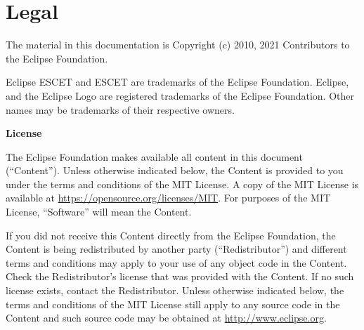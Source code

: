 \documentclass{report}
\begin{document}
\chapter{Legal}

The material in this documentation is
Copyright (c) 2010, 2021 Contributors to the Eclipse Foundation.

Eclipse ESCET and ESCET are trademarks of the Eclipse Foundation.
Eclipse, and the Eclipse Logo are registered trademarks of the
Eclipse Foundation. Other names may be trademarks of their
respective owners.

\textbf{License}

The Eclipse Foundation makes available all content in this document
(``Content''). Unless otherwise indicated below, the Content is provided to you
under the terms and conditions of the MIT License. A copy of the MIT License
is available at \url{https://opensource.org/licenses/MIT}. For purposes of the
MIT License, ``Software'' will mean the Content.

If you did not receive this Content directly from the Eclipse Foundation,
the Content is being redistributed by another party (``Redistributor'') and
different terms and conditions may apply to your use of any object code in
the Content. Check the Redistributor's license that was provided with the
Content. If no such license exists, contact the Redistributor. Unless
otherwise indicated below, the terms and conditions of the MIT License
still apply to any source code in the Content and such source code may be
obtained at \url{http://www.eclipse.org}.





\end{document}
